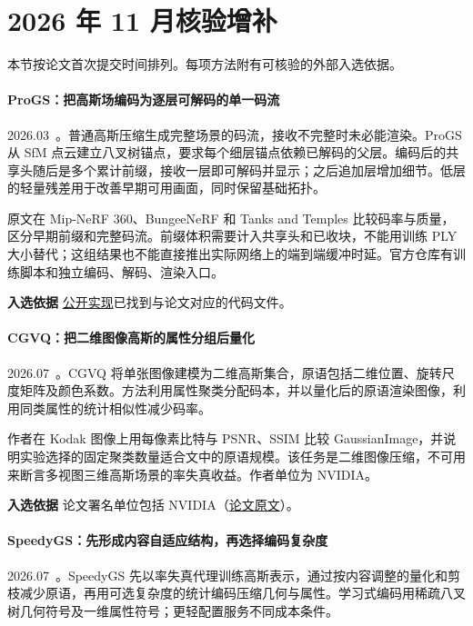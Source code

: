 \section{2026 年 11 月核验增补}

本节按论文首次提交时间排列。每项方法附有可核验的外部入选依据。

\paragraph{ProGS：把高斯场编码为逐层可解码的单一码流}
2026.03~\cite{2603_09703}。普通高斯压缩生成完整场景的码流，接收不完整时未必能渲染。ProGS 从 SfM 点云建立八叉树锚点，要求每个细层锚点依赖已解码的父层。编码后的共享头随后是多个累计前缀，接收一层即可解码并显示；之后追加层增加细节。低层的轻量残差用于改善早期可用画面，同时保留基础拓扑。

原文在 Mip-NeRF 360、BungeeNeRF 和 Tanks and Temples 比较码率与质量，区分早期前缀和完整码流。前缀体积需要计入共享头和已收块，不能用训练 PLY 大小替代；这组结果也不能直接推出实际网络上的端到端缓冲时延。官方仓库有训练脚本和独立编码、解码、渲染入口。

\textbf{入选依据} \href{https://github.com/zhiyetang/progs-official}{公开实现}已找到与论文对应的代码文件。

\paragraph{CGVQ：把二维图像高斯的属性分组后量化}
2026.07~\cite{2607_05667}。CGVQ 将单张图像建模为二维高斯集合，原语包括二维位置、旋转尺度矩阵及颜色系数。方法利用属性聚类分配码本，并以量化后的原语渲染图像，利用同类属性的统计相似性减少码率。

作者在 Kodak 图像上用每像素比特与 PSNR、SSIM 比较 GaussianImage，并说明实验选择的固定聚类数量适合文中的原语规模。该任务是二维图像压缩，不可用来断言多视图三维高斯场景的率失真收益。作者单位为 NVIDIA。

\textbf{入选依据} 论文署名单位包括 NVIDIA（\href{https://arxiv.org/html/2607.05667v1}{论文原文}）。

\paragraph{SpeedyGS：先形成内容自适应结构，再选择编码复杂度}
2026.07~\cite{2607_12656}。SpeedyGS 先以率失真代理训练高斯表示，通过按内容调整的量化和剪枝减少原语，再用可选复杂度的统计编码压缩几何与属性。学习式编码用稀疏八叉树几何符号及一维属性符号；更轻配置服务不同成本条件。

